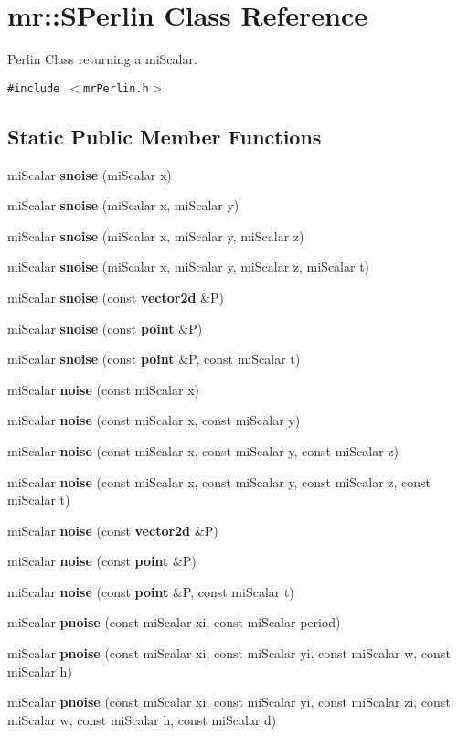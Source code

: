 \section{mr::SPerlin Class Reference}
\label{classmr_1_1SPerlin}
Perlin Class returning a mi\-Scalar.  


{\tt \#include $<$mr\-Perlin.h$>$}

\subsection*{Static Public Member Functions}
\begin{CompactItemize}
\item 
mi\-Scalar {\bf snoise} (mi\-Scalar x)
\item 
mi\-Scalar {\bf snoise} (mi\-Scalar x, mi\-Scalar y)
\item 
mi\-Scalar {\bf snoise} (mi\-Scalar x, mi\-Scalar y, mi\-Scalar z)
\item 
mi\-Scalar {\bf snoise} (mi\-Scalar x, mi\-Scalar y, mi\-Scalar z, mi\-Scalar t)
\item 
mi\-Scalar {\bf snoise} (const {\bf vector2d} \&P)
\item 
mi\-Scalar {\bf snoise} (const {\bf point} \&P)
\item 
mi\-Scalar {\bf snoise} (const {\bf point} \&P, const mi\-Scalar t)
\item 
mi\-Scalar {\bf noise} (const mi\-Scalar x)
\item 
mi\-Scalar {\bf noise} (const mi\-Scalar x, const mi\-Scalar y)
\item 
mi\-Scalar {\bf noise} (const mi\-Scalar x, const mi\-Scalar y, const mi\-Scalar z)
\item 
mi\-Scalar {\bf noise} (const mi\-Scalar x, const mi\-Scalar y, const mi\-Scalar z, const mi\-Scalar t)
\item 
mi\-Scalar {\bf noise} (const {\bf vector2d} \&P)
\item 
mi\-Scalar {\bf noise} (const {\bf point} \&P)
\item 
mi\-Scalar {\bf noise} (const {\bf point} \&P, const mi\-Scalar t)
\item 
mi\-Scalar {\bf pnoise} (const mi\-Scalar xi, const mi\-Scalar period)
\item 
mi\-Scalar {\bf pnoise} (const mi\-Scalar xi, const mi\-Scalar yi, const mi\-Scalar w, const mi\-Scalar h)
\item 
mi\-Scalar {\bf pnoise} (const mi\-Scalar xi, const mi\-Scalar yi, const mi\-Scalar zi, const mi\-Scalar w, const mi\-Scalar h, const mi\-Scalar d)

\end{CompactItemize}
